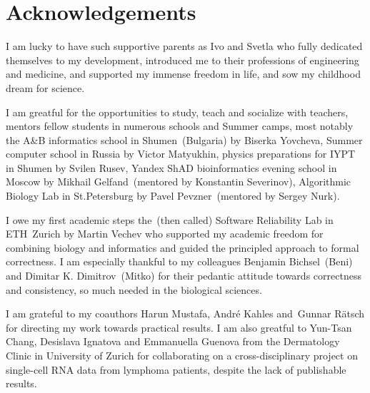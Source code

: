 
\bigskip

\begingroup
\let\clearpage\relax
\let\cleardoublepage\relax
\let\cleardoublepage\relax
\chapter*{Acknowledgements}

\def\thanks#1{%
\begingroup
\leftskip1em
\noindent #1
\par
\endgroup
}

I am lucky to have such supportive parents as Ivo and Svetla who fully dedicated
themselves to my development, introduced me to their professions of engineering
and medicine, and supported my immense freedom in life, and sow my childhood
dream for science.

I am greatful for the opportunities to study, teach and socialize with teachers,
mentors fellow students in numerous schools and Summer camps, most notably the
A\&B informatics school in Shumen~(Bulgaria) by Biserka Yovcheva, Summer
computer school in Russia by Victor Matyukhin, physics preparations for IYPT in
Shumen by Svilen Rusev, Yandex ShAD bioinformatics evening school in Moscow by
Mikhail Gelfand~(mentored by Konstantin Severinov), Algorithmic Biology Lab in
St.Petersburg by Pavel Pevzner~(mentored by Sergey Nurk).

I owe my first academic steps the~(then called) Software Reliability Lab in
ETH~Zurich by Martin Vechev who supported my academic freedom for combining
biology and informatics and guided the principled approach to formal
correctness. I am especially thankful to my colleagues Benjamin Bichsel~(Beni)
and Dimitar K. Dimitrov~(Mitko) for their pedantic attitude towards correctness
and consistency, so much needed in the biological sciences.

I am grateful to my coauthors Harun Mustafa, André Kahles and Gunnar Rätsch for
directing my \A work towards practical results. I am also greatful to Yun-Tsan
Chang, Desislava Ignatova and Emmanuella Guenova from the Dermatology Clinic in
University of Zurich for collaborating on a cross-disciplinary project on
single-cell RNA data from lymphoma patients, despite the lack of publishable
results.

